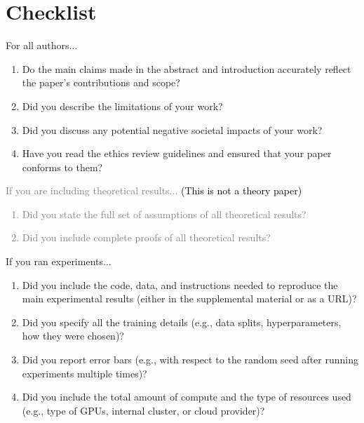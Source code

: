\documentclass{article}
\begin{document}
\section*{Checklist}
\begin{enumerate}
\item For all authors...
\begin{enumerate}
  \item Do the main claims made in the abstract and introduction accurately reflect the paper's contributions and scope?
  \item Did you describe the limitations of your work?
  \item Did you discuss any potential negative societal impacts of your work?
  \item Have you read the ethics review guidelines and ensured that your paper conforms to them?
    \answerYes{}
\end{enumerate}


\textcolor{gray}{
\item If you are including theoretical results...
\textcolor{black}{(This is not a theory paper)}
\begin{enumerate}
  \item Did you state the full set of assumptions of all theoretical results?
    \answerNA{}
  \item Did you include complete proofs of all theoretical results?
    \answerNA{}
\end{enumerate}
}


\item If you ran experiments...
\begin{enumerate}
  \item Did you include the code, data, and instructions needed to
    reproduce the main experimental results (either in the supplemental
    material or as a URL)?
    \answerYes{}
  \item Did you specify all the training details (e.g., data splits,
    hyperparameters, how they were chosen)?
    \answerYes{}
  \item Did you report error bars (e.g., with respect to the random seed after running experiments multiple times)?
  \item Did you include the total amount of compute and the type of
    resources used (e.g., type of GPUs, internal cluster, or cloud provider)?
    \answerYes{}
\end{enumerate}


\end{enumerate}
\end{document}

